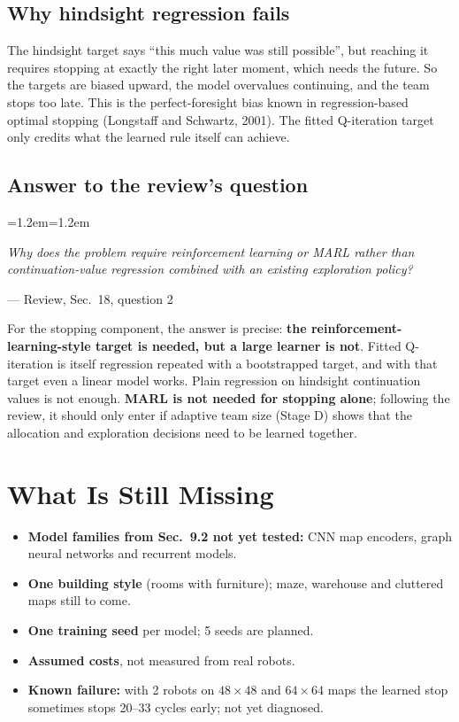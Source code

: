 \documentclass[11pt,a4paper]{article}
\newenvironment{review}[1]
  {\par\smallskip\noindent\begin{minipage}{\linewidth}\begin{list}{}{\leftmargin=1.2em\rightmargin=1.2em}\item[]%
   \def\reviewsrc{#1}\small\itshape\color{black!80}}
  {\par\hfill\upshape\footnotesize --- Review, \reviewsrc\end{list}\end{minipage}\par\smallskip}
\begin{document}
\subsection{Why hindsight regression fails}

The hindsight target says ``this much value was still possible'', but reaching it requires stopping at exactly the right later moment, which needs the future. So the targets are biased upward, the model overvalues continuing, and the team stops too late. This is the perfect-foresight bias known in regression-based optimal stopping (Longstaff and Schwartz, 2001). The fitted Q-iteration target only credits what the learned rule itself can achieve.

\subsection{Answer to the review's question}

\begin{review}{Sec.~18, question 2}
Why does the problem require reinforcement learning or MARL rather than continuation-value regression combined with an existing exploration policy?
\end{review}

For the stopping component, the answer is precise: \textbf{the reinforcement-learning-style target is needed, but a large learner is not}. Fitted Q-iteration is itself regression repeated with a bootstrapped target, and with that target even a linear model works. Plain regression on hindsight continuation values is not enough. \textbf{MARL is not needed for stopping alone}; following the review, it should only enter if adaptive team size (Stage D) shows that the allocation and exploration decisions need to be learned together.

\section{What Is Still Missing}

\begin{itemize}
  \item \textbf{Model families from Sec.~9.2 not yet tested:} CNN map encoders, graph neural networks and recurrent models.
  \item \textbf{One building style} (rooms with furniture); maze, warehouse and cluttered maps still to come.
  \item \textbf{One training seed} per model; 5 seeds are planned.
  \item \textbf{Assumed costs}, not measured from real robots.
  \item \textbf{Known failure:} with 2 robots on $48\times48$ and $64\times64$ maps the learned stop sometimes stops 20--33 cycles early; not yet diagnosed.
\end{itemize}
\end{document}
